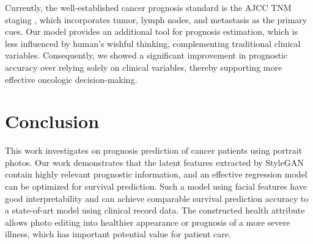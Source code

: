 \documentclass[runningheads]{llncs}
\begin{document}
Currently, the well-established cancer prognosis standard is the AJCC TNM staging \cite{amin2017eighth}, which incorporates tumor, lymph nodes, and metastasis as the primary cues. Our model provides an additional tool for prognosis estimation, which is less influenced by human’s wishful thinking, complementing traditional clinical variables. Consequently, we showed a significant improvement in prognostic accuracy over relying solely on clinical variables, thereby supporting more effective oncologic decision-making.

\section{Conclusion}
This work investigates on prognosis prediction of cancer patients using portrait photos. Our work demonstrates that the latent features extracted by StyleGAN contain highly relevant prognostic information, and an effective regression model can be optimized for survival prediction. Such a model using facial features have good interpretability and can achieve comparable survival prediction accuracy to a state-of-art model using clinical record data. The constructed health attribute allows photo editing into healthier appearance or prognosis of a more severe illness, which has important potential value for patient care. %
\end{document}
